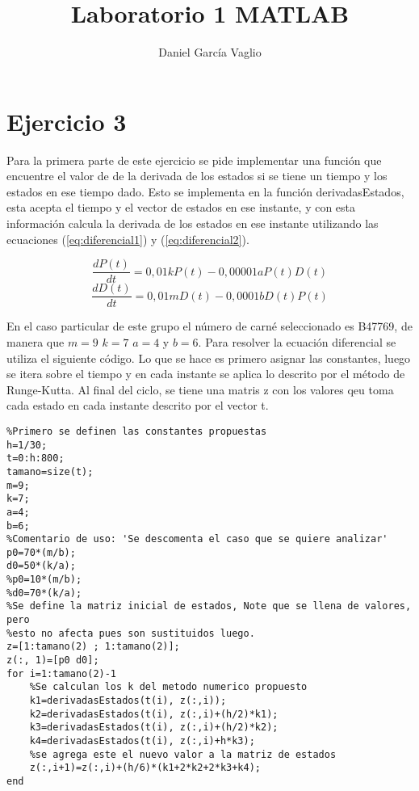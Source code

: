 \documentclass {article}
\begin{document}
\title{Laboratorio 1 MATLAB}
\author{Daniel García Vaglio}
\maketitle

\section{Ejercicio 3}

Para la primera parte de este ejercicio se pide implementar una función  que encuentre el valor de de la derivada de los estados si se tiene un tiempo y los estados en ese tiempo dado. Esto se implementa en la función derivadasEstados, esta acepta el tiempo y el vector de estados en ese instante, y con esta información calcula la derivada de los estados en ese instante utilizando las ecuaciones (\ref{eq:diferencial1}) y (\ref{eq:diferencial2}). 

\begin{equation}
\frac{dP(t)}{dt}=0,01kP(t)-0,00001aP(t)D(t)
\label{eq:diferencial1}
\end{equation}
\begin{equation}
\frac{dD(t)}{dt}=0,01mD(t)-0,0001bD(t)P(t)
\label{eq:diferencial2}
\end{equation}

En el caso particular de este grupo el número de carné seleccionado es B47769, de manera que $m=9$ $k=7$ $a=4$ y $b=6$. Para resolver la ecuación diferencial se utiliza el siguiente código. Lo que se hace es primero asignar las constantes, luego se itera sobre el tiempo y en cada instante se aplica lo descrito por el método de Runge-Kutta. Al final del ciclo, se tiene una matris z con los valores qeu toma cada estado en cada instante descrito por el vector t. 

\begin{lstlisting}
%Primero se definen las constantes propuestas
h=1/30;
t=0:h:800;
tamano=size(t);
m=9;
k=7;
a=4;
b=6;
%Comentario de uso: 'Se descomenta el caso que se quiere analizar'
p0=70*(m/b);
d0=50*(k/a);
%p0=10*(m/b);
%d0=70*(k/a);
%Se define la matriz inicial de estados, Note que se llena de valores, pero
%esto no afecta pues son sustituidos luego.
z=[1:tamano(2) ; 1:tamano(2)];
z(:, 1)=[p0 d0];
for i=1:tamano(2)-1
    %Se calculan los k del metodo numerico propuesto
    k1=derivadasEstados(t(i), z(:,i));
    k2=derivadasEstados(t(i), z(:,i)+(h/2)*k1);
    k3=derivadasEstados(t(i), z(:,i)+(h/2)*k2);
    k4=derivadasEstados(t(i), z(:,i)+h*k3);
    %se agrega este el nuevo valor a la matriz de estados
    z(:,i+1)=z(:,i)+(h/6)*(k1+2*k2+2*k3+k4);
end
\end{lstlisting} 
\end{document}
